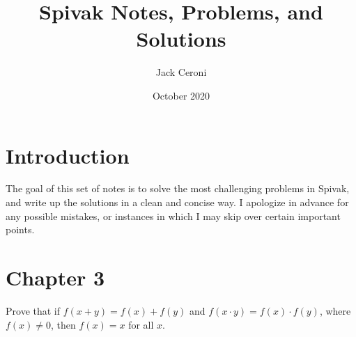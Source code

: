 \documentclass[10pt, oneside]{amsart}
\title{Spivak Notes, Problems, and Solutions}
\author{Jack Ceroni}
\date{October 2020}
\newenvironment{problem}[2][Problem]{\begin{trivlist}
\item[\hskip \labelsep {\bfseries #1}\hskip \labelsep {\bfseries #2.}]}{\end{trivlist}}
\begin{document}
    \maketitle

    \tableofcontents

    \vspace{.25in}

    \newpage

    \section{Introduction}

    The goal of this set of notes is to solve the most challenging problems in Spivak, and
    write up the solutions in a clean and concise way. I apologize in advance for any
    possible mistakes, or instances in which I may skip over certain important points.

    \section{Chapter 3}

    \begin{problem}{3.17}
      Prove that if $f(x + y) = f(x) + f(y)$ and $f(x \cdot y) = f(x) \cdot f(y)$, where $f(x) \neq 0$, then $f(x) = x$ for all $x$.
    \end{problem}
\end{document}
